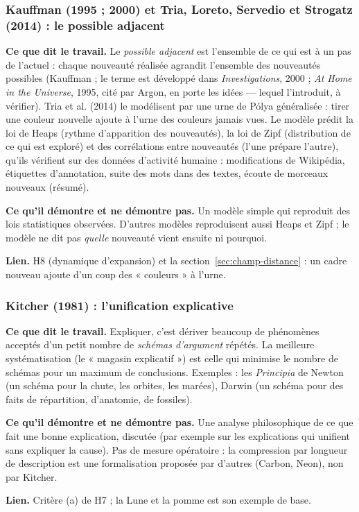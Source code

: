 \documentclass[a4paper,11pt]{article}
\newcommand{\cours}[1]{\par\smallskip\textbf{\textsf{#1}}\enspace}
\begin{document}
\subsubsection{Kauffman (1995 ; 2000) et Tria, Loreto, Servedio et Strogatz (2014) : le possible adjacent}
\cours{Ce que dit le travail.} Le \emph{possible adjacent} est l'ensemble de ce qui est à un pas de l'actuel : chaque nouveauté réalisée agrandit l'ensemble des nouveautés possibles (Kauffman ; le terme est développé dans \emph{Investigations}, 2000 ; \emph{At Home in the Universe}, 1995, cité par Argon, en porte les idées — lequel l'introduit, à vérifier). Tria et al. (2014) le modélisent par une urne de Pólya généralisée : tirer une couleur nouvelle ajoute à l'urne des couleurs jamais vues. Le modèle prédit la loi de Heaps (rythme d'apparition des nouveautés), la loi de Zipf (distribution de ce qui est exploré) et des corrélations entre nouveautés (l'une prépare l'autre), qu'ils vérifient sur des données d'activité humaine : modifications de Wikipédia, étiquettes d'annotation, suite des mots dans des textes, écoute de morceaux nouveaux (résumé).
\cours{Ce qu'il démontre et ne démontre pas.} Un modèle simple qui reproduit des lois statistiques observées. D'autres modèles reproduisent aussi Heaps et Zipf ; le modèle ne dit pas \emph{quelle} nouveauté vient ensuite ni pourquoi.
\cours{Lien.} H8 (dynamique d'expansion) et la section~\ref{sec:champ-distance} : un cadre nouveau ajoute d'un coup des « couleurs » à l'urne.

\subsubsection{Kitcher (1981) : l'unification explicative}
\cours{Ce que dit le travail.} Expliquer, c'est dériver beaucoup de phénomènes acceptés d'un petit nombre de \emph{schémas d'argument} répétés. La meilleure systématisation (le « magasin explicatif ») est celle qui minimise le nombre de schémas pour un maximum de conclusions. Exemples : les \emph{Principia} de Newton (un schéma pour la chute, les orbites, les marées), Darwin (un schéma pour des faits de répartition, d'anatomie, de fossiles).
\cours{Ce qu'il démontre et ne démontre pas.} Une analyse philosophique de ce que fait une bonne explication, discutée (par exemple sur les explications qui unifient sans expliquer la cause). Pas de mesure opératoire : la compression par longueur de description est une formalisation proposée par d'autres (Carbon, Neon), non par Kitcher.
\cours{Lien.} Critère (a) de H7 ; la Lune et la pomme est son exemple de base.
\end{document}
